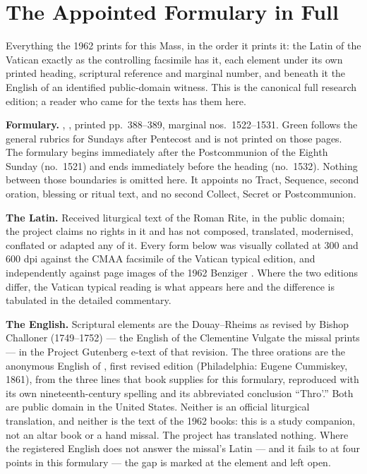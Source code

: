 \section*{The Appointed Formulary in Full}

Everything the 1962  prints for this Mass, in the order
it prints it: the Latin of the Vatican  exactly as the
controlling facsimile has it, each element under its own printed heading,
scriptural reference and marginal number, and beneath it the English of an
identified public-domain witness. This is the canonical full research edition;
a reader who came for the texts has them here.

\textbf{Formulary.} , , printed pp.~388--389, marginal nos.\ 1522--1531. Green follows the
general rubrics for Sundays after Pentecost and is not printed on those pages.
The formulary begins immediately after the Postcommunion of the Eighth Sunday
(no.\ 1521) and ends immediately before the heading  (no.\ 1532). Nothing between those boundaries is omitted
here. It appoints no Tract, Sequence, second oration, blessing or ritual text,
and no second Collect, Secret or Postcommunion.

\textbf{The Latin.} Received liturgical text of the Roman Rite, in the public
domain; the project claims no rights in it and has not composed, translated,
modernised, conflated or adapted any of it. Every form below was visually
collated at 300 and 600 dpi against the CMAA facsimile of the Vatican typical
edition, and independently against page images of the 1962 Benziger
. Where the two editions differ, the Vatican
typical reading is what appears here and the difference is tabulated in the
detailed commentary.

\textbf{The English.} Scriptural elements are the Douay--Rheims as revised by
Bishop Challoner (1749--1752) --- the English of the Clementine Vulgate the
missal prints --- in the Project Gutenberg e-text of that revision. The three
orations are the anonymous English of , first revised edition
(Philadelphia: Eugene Cummiskey, 1861), from the three lines that book
supplies for this formulary, reproduced with its own nineteenth-century
spelling and its abbreviated conclusion ``Thro'.'' Both are public domain in
the United States. Neither is an official liturgical translation, and neither
is the text of the 1962 books: this is a study companion, not an altar book or
a hand missal. The project has translated nothing. Where the registered
English does not answer the missal's Latin --- and it fails to at four points
in this formulary --- the gap is marked at the element and left open.

